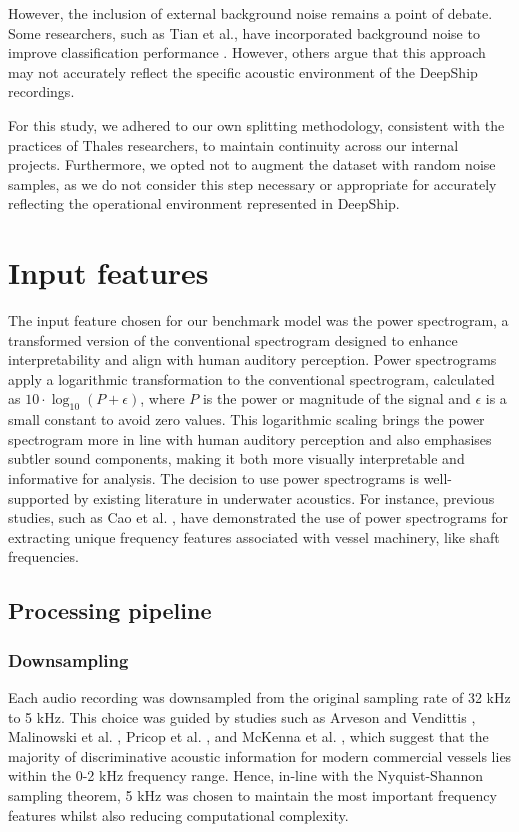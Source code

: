 However, the inclusion of external background noise remains a point of debate. Some researchers, such as Tian et al., have incorporated background noise to improve classification performance \cite{tian_joint_2023}. However, others argue that this approach may not accurately reflect the specific acoustic environment of the DeepShip recordings.

For this study, we adhered to our own splitting methodology, consistent with the practices of Thales researchers, to maintain continuity across our internal projects. Furthermore, we opted not to augment the dataset with random noise samples, as we do not consider this step necessary or appropriate for accurately reflecting the operational environment represented in DeepShip.

\section{Input features}\label{sec:inputs}

The input feature chosen for our benchmark model was the power spectrogram, a transformed version of the conventional spectrogram designed to enhance interpretability and align with human auditory perception. Power spectrograms apply a logarithmic transformation to the conventional spectrogram, calculated as $10 \cdot \log_{10}(P + \epsilon)$, where $P$ is the power or magnitude of the signal and $\epsilon$ is a small constant to avoid zero values. This logarithmic scaling brings the power spectrogram more in line with human auditory perception and also emphasises subtler sound components, making it both more visually interpretable and informative for analysis. The decision to use power spectrograms is well-supported by existing literature in underwater acoustics. For instance, previous studies, such as Cao et al. \cite{cao_underwater_2019}, have demonstrated the use of power spectrograms for extracting unique frequency features associated with vessel machinery, like shaft frequencies. 

\subsection{Processing pipeline}

\subsubsection{Downsampling}

Each audio recording was downsampled from the original sampling rate of 32 kHz to 5 kHz. This choice was guided by studies such as Arveson and Vendittis \cite{arveson_radiated_2000}, Malinowski et al. \cite{malinowski_underwater_2001}, Pricop et al. \cite{pricop_underwater_2010}, and McKenna et al. \cite{mckenna_underwater_2012}, which suggest that the majority of discriminative acoustic information for modern commercial vessels lies within the 0-2 kHz frequency range. Hence, in-line with the Nyquist-Shannon sampling theorem, 5 kHz was chosen to maintain the most important frequency features whilst also reducing computational complexity. 

